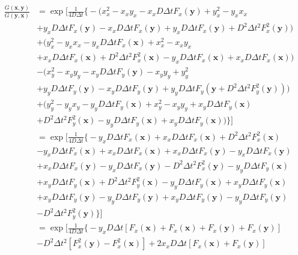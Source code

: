 \documentclass[11pt]{article}
\begin{document}
\begin{align*}
	\frac{G(\mathbf{x},\mathbf{y})}{G(\mathbf{y},\mathbf{x})} &= \exp \bigg[ \frac{1}{4D\Delta t} \Big\{
	 - \big( x_x^2 - x_x y_x - x_x D\Delta t F_x(\mathbf{y}) + y_x^2 - y_x x_x \\
	&+ y_x D \Delta t F_x (\mathbf{y}) - x_x D \Delta t F_x(\mathbf{y}) + y_x D \Delta t F_x(\mathbf{y}) + D^2 \Delta t^2 F_x^2(\mathbf{y}) \big) \\ 
	&+ \big( y_x^2 - y_x x_x - y_x D \Delta t F_x(\mathbf{x}) + x_x^2 - x_x y_x \\
	&+ x_x D \Delta t F_x(\mathbf{x}) + D^2 \Delta t^2 F_x^2(\mathbf{x}) - y_x D \Delta t F_x(\mathbf{x}) + x_x D \Delta t F_x(\mathbf{x}) \big) \\
	&- \big( x^2_y -x_y y_y - x_y D \Delta t F_y(\mathbf{y}) - x_y y_y + y_y^2 \\
	&+ y_y D \Delta t F_y(\mathbf{y}) - x_y D \Delta t F_y(\mathbf{y}) + y_y D \Delta t F_y(\mathbf{y} + D^2 \Delta t^2 F_y^2 (\mathbf{y})) \big) \\
	&+ \big( y_y^2 - y_y x_y - y_y D \Delta t F_y(\mathbf{x}) + x_y^2 - x_y y_y + x_y D \Delta t F_y(\mathbf{x}) \\
	&+ D^2 \Delta t^2 F_y^2 (\mathbf{x}) - y_y D \Delta t F_y (\mathbf{x}) + x_y D \Delta t F_y (\mathbf{x}) \big) \Big\} \bigg] \\
	&= \exp \bigg[ \frac{1}{4D\Delta t} \Big\{ - y_x D \Delta t F_x(\mathbf{x}) + x_x D \Delta t F_x(\mathbf{x}) + D^2 \Delta t^2 F_x^2(\mathbf{x}) \\
	&- y_x D \Delta t F_x (\mathbf{x}) + x_x D\Delta t F_x(\mathbf{x}) + x_x D \Delta t F_x(\mathbf{y}) - y_x D \Delta t F_x (\mathbf{y}) \\
	&+ x_x D \Delta t F_x (\mathbf{y}) - y_x D \Delta t F_x (\mathbf{y}) - D^2 \Delta t^2 F_x^2(\mathbf{y}) - y_y D \Delta t F_y(\mathbf{x}) \\
	&+ x_y D \Delta t F_y (\mathbf{x}) + D^2 \Delta t^2 F_y^2 (\mathbf{x}) - y_y D \Delta t F_y(\mathbf{x}) + x_y D \Delta t F_y(\mathbf{x}) \\
	&+ x_y D \Delta t F_y (\mathbf{y}) - y_y D \Delta t F_y (\mathbf{y}) + x_y D \Delta t F_y (\mathbf{y}) - y_y D \Delta t F_y(\mathbf{y}) \\
	&- D^2 \Delta t^2 F_y^2(\mathbf{y})\Big\} \bigg] \\
	&= \exp \bigg[ \frac{1}{4D\Delta t} \Big\{ -y_x D\Delta t \left[ F_x(\mathbf{x}) + F_x(\mathbf{x}) + F_x(\mathbf{y}) + F_x(\mathbf{y}) \right] \\
	&- D^2 \Delta t^2 \left[ F_x^2(\mathbf{y}) - F_x^2(\mathbf{x}) \right] + 2x_x D \Delta t \left[ F_x(\mathbf{x}) + F_x (\mathbf{y}) \right] \\

\end{align*}
\end{document}
